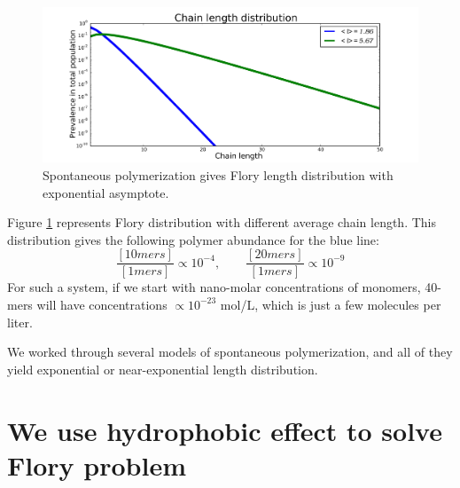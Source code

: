 \documentclass[twoside,twocolumn,9pt]{article}
\newcommand{\pq}[1]{\left[ #1 \right]}
\begin{document}
\begin{figure}[h!]
  \centering
  \includegraphics[width=\columnwidth]{pictures/flory2.pdf} 
  \caption{Spontaneous polymerization gives Flory length distribution with exponential asymptote.}
  \label{fig:flory}
\end{figure}
Figure \ref{fig:flory} represents Flory distribution with different average chain length. 
This distribution gives the following 
polymer abundance for the blue line:
\begin{equation}
  \frac{\pq{10mers}}{\pq{1mers}}\propto10^{-4},\qquad\frac{\pq{20mers}}{\pq{1mers}}\propto10^{-9}
\end{equation} 
For such a system, if we start with nano-molar concentrations of monomers, 40-mers will have 
concentrations $\propto 10^{-23} $ mol/L, which is just a few molecules per liter. 

We worked through several models of spontaneous polymerization, and all of they yield exponential 
or near-exponential length distribution.

\section{We use hydrophobic effect to solve Flory problem}
\end{document}
